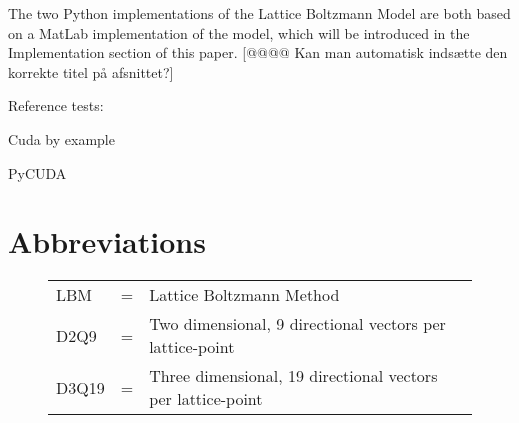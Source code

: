 The two Python implementations of the Lattice Boltzmann Model are both based on a MatLab implementation of the model, which will be introduced in the Implementation section of this paper. [@@@@ Kan man automatisk indsætte den korrekte titel på afsnittet?]

Reference tests:

Cuda by example\cite{cudabyexample}

PyCUDA \cite{kloeckner_pycuda_2009}

\newpage

\section{Abbreviations}

\begin{figure}[htb]
\centering
	\begin{tabular}{lcl}
		LBM & = & Lattice Boltzmann Method\\
		D2Q9 & = & Two dimensional, 9 directional vectors per lattice-point\\
		D3Q19 & = & Three dimensional, 19 directional vectors per lattice-point
	\end{tabular}
\end{figure}

\newpage


\newpage


\newpage


\newpage


\newpage


\newpage


\newpage


\newpage


\newpage





